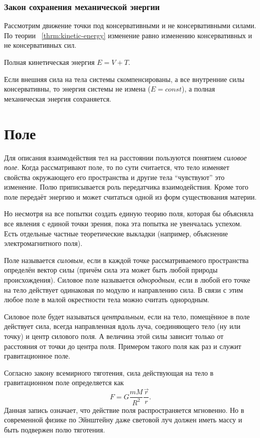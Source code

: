 \subsubsection{Закон сохранения механической энергии}

Рассмотрим движение точки под консервативными и не консервативными силами. По
теории ~\ref{thrm:kinetic-energy} изменение равно изменению консервативных и
не консервативных сил.

Полная кинетическая энергия \( E = V + T \).

Если внешняя сила на тела системы скомпенсированы, а все внутренние силы
консервативны, то энергия системы не измена (\( E = const \)), а полная
механическая энергия сохраняется.

\section{Поле}

Для описания взаимодействия тел на расстоянии пользуются понятием \emph{силовое
	поле}. Когда рассматривают поле, то по сути считается, что тело изменяет
свойства окружающего его пространства и другие тела ``чувствуют'' это
изменение. Полю приписывается роль передатчика взаимодействия. Кроме того поле
передаёт энергию и может считаться одной из форм существования материи.

Но несмотря на все попытки создать единую теорию поля, которая бы объясняла
все явления с единой точки зрения, пока эта попытка не увенчалась успехом. Есть
отдельные частные теоретические выкладки (например, объяснение
электромагнитного поля).

Поле называется \emph{силовым}, если в каждой точке рассматриваемого
пространства определён вектор силы (причём сила эта может быть любой природы
происхождения). Силовое поле называется \emph{однородным}, если в любой его
точке на тело действует одинаковая по модулю и направлению сила. В связи с этим
любое поле в малой окрестности тела можно считать однородным.

Силовое поле будет называться \emph{центральным}, если на тело, помещённое в
поле действует сила, всегда направленная вдоль луча, соединяющего тело (ну или
точку) и центр силового поля. А величина этой силы зависит только от расстояния
от точки до центра поля. Примером такого поля как раз и служит
гравитационное поле.

Согласно закону всемирного тяготения, сила действующая на тело в гравитационном
поле определяется как \[
	F = G \frac{m M}{R^2 } \frac{\vec{r}}{r}
	.\] Данная запись означает, что действие поля распространяется мгновенно. Но в
современной физике по Эйнштейну даже световой луч должен иметь массу и быть
подвержен полю тяготения.

